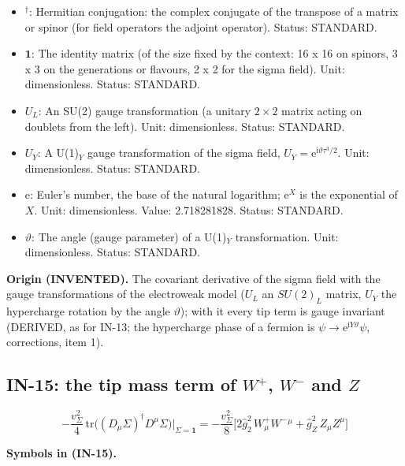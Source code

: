 \documentclass[
  10pt,
]{article}
\begin{document}
\begin{itemize}
\item
  \({}^\dagger\): Hermitian conjugation: the complex conjugate of the
  transpose of a matrix or spinor (for field operators the adjoint
  operator). Status: STANDARD.
\item
  \(\mathbf{1}\): The identity matrix (of the size fixed by the context:
  16 x 16 on spinors, 3 x 3 on the generations or flavours, 2 x 2 for
  the sigma field). Unit: dimensionless. Status: STANDARD.
\item
  \(U_L\): An SU(2) gauge transformation (a unitary \(2 \times 2\)
  matrix acting on doublets from the left). Unit: dimensionless. Status:
  STANDARD.
\item
  \(U_Y\): A U(1)\(_Y\) gauge transformation of the sigma field,
  \(U_Y = \mathrm{e}^{\mathrm{i}\vartheta\tau^3/2}\). Unit:
  dimensionless. Status: STANDARD.
\item
  \(\mathrm{e}\): Euler's number, the base of the natural logarithm;
  \(\mathrm{e}^{X}\) is the exponential of \(X\). Unit: dimensionless.
  Value: 2.718281828. Status: STANDARD.
\item
  \(\vartheta\): The angle (gauge parameter) of a U(1)\(_Y\)
  transformation. Unit: dimensionless. Status: STANDARD.
\end{itemize}

\textbf{Origin (INVENTED).} The covariant derivative of the sigma field
with the gauge transformations of the electroweak model (\(U_L\) an
\(SU(2)_L\) matrix, \(U_Y\) the hypercharge rotation by the angle
\(\vartheta\)); with it every tip term is gauge invariant (DERIVED, as
for IN-13; the hypercharge phase of a fermion is
\(\psi \to \mathrm{e}^{\mathrm{i}Y\vartheta}\psi\), corrections, item
1).

\hypertarget{in-15-the-tip-mass-term-of-w-w--and-z}{%
\subsection{\texorpdfstring{IN-15: the tip mass term of \(W^+\), \(W^-\)
and
\(Z\)}{IN-15: the tip mass term of W\^{}+, W\^{}- and Z}}\label{in-15-the-tip-mass-term-of-w-w--and-z}}

\[
-\frac{v_\Sigma^2}{4}\,\mathrm{tr}\big((D_\mu\Sigma)^\dagger D^\mu\Sigma\big)\Big\vert_{\Sigma = \mathbf{1}}
= -\frac{v_\Sigma^2}{8}\Big[2\hat g_2^2\,W^+_\mu W^-{}^\mu + \hat g_Z^2\,Z_\mu Z^\mu\Big] \tag{IN-15}
\]

\textbf{Symbols in (IN-15).}
\end{document}
